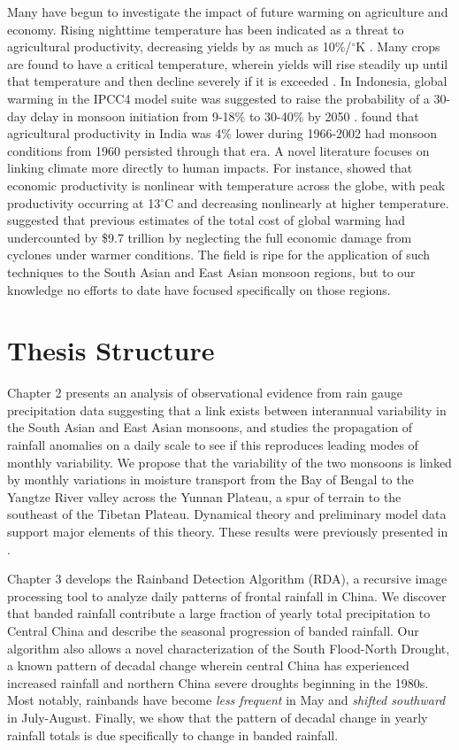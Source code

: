 	Many have begun to investigate the impact of future warming on agriculture and economy. Rising nighttime temperature has been indicated as a threat to agricultural productivity, decreasing yields by as much as 10\%/$^{\circ}$K \citep{Peng2004}. Many crops are found to have a critical temperature, wherein yields will rise steadily up until that temperature and then decline severely if it is exceeded \citep{Schlenker2009}. In Indonesia, global warming in the IPCC4 model suite was suggested to raise the probability of a 30-day delay in monsoon initiation from 9-18\% to 30-40\% by 2050 \citep{Naylor2007}. \citet{Auffhammer2012} found that agricultural productivity in India was 4\% lower during 1966-2002 had monsoon conditions from 1960 persisted through that era. A novel literature focuses on linking climate more directly to human impacts. For instance, \citet{Burke2015} showed that economic productivity is nonlinear with temperature across the globe, with peak productivity occurring at 13$^{\circ}$C and decreasing nonlinearly at higher temperature. \citet{Hsiang2014} suggested that previous estimates of the total cost of global warming had undercounted by \$9.7 trillion by neglecting the full economic damage from cyclones under warmer conditions. The field is ripe for the application of such techniques to the South Asian and East Asian monsoon regions, but to our knowledge no efforts to date have focused specifically on those regions.

\section{Thesis Structure}

	Chapter 2 presents an analysis of observational evidence from rain gauge precipitation data suggesting that a link exists between interannual variability in the South Asian and East Asian monsoons, and studies the propagation of rainfall anomalies on a daily scale to see if this reproduces leading modes of monthly variability. We propose that the variability of the two monsoons is linked by monthly variations in moisture transport from the Bay of Bengal to the Yangtze River valley across the Yunnan Plateau, a spur of terrain to the southeast of the Tibetan Plateau. Dynamical theory and preliminary model data support major elements of this theory. These results were previously presented in \citep{Day2015}.

	Chapter 3 develops the Rainband Detection Algorithm (RDA), a recursive image processing tool to analyze daily patterns of frontal rainfall in China. We discover that banded rainfall contribute a large fraction of yearly total precipitation to Central China and describe the seasonal progression of banded rainfall. Our algorithm also allows a novel characterization of the South Flood-North Drought, a known pattern of decadal change wherein central China has experienced increased rainfall and northern China severe droughts beginning in the 1980s. Most notably, rainbands have become \textit{less frequent} in May and \textit{shifted southward} in July-August. Finally, we show that the pattern of decadal change in yearly rainfall totals is due specifically to change in banded rainfall.


